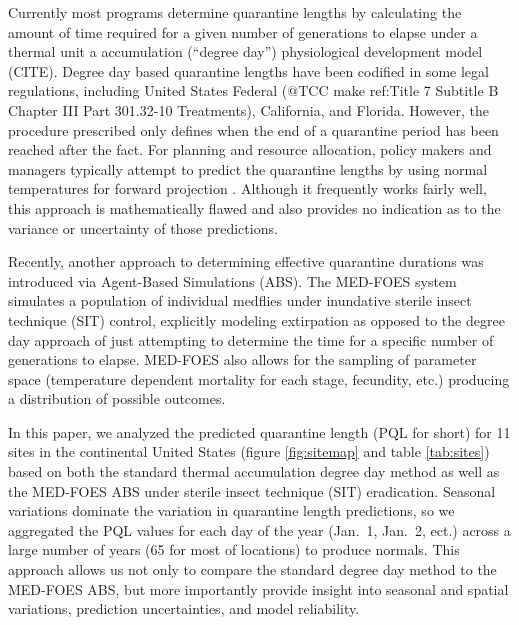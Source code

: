 \documentclass[10pt,a4paper,twocolumn]{article}
\begin{document}
Currently most programs determine quarantine lengths 
by calculating the amount of time required for a given number 
of generations to elapse under a thermal unit a accumulation (``degree day'')
physiological development model (CITE).
Degree day based quarantine lengths have been codified in some legal
regulations, including United States Federal 
(@TCC make ref:Title 7 Subtitle B Chapter III Part 301.32-10 Treatments),
California\cite{3-CA-ADC-3406}, and Florida\cite{personal communication}.
However, the procedure prescribed only defines when the end of a
quarantine period has been reached after the fact.
For planning and resource allocation, policy makers and managers 
typically attempt to predict the quarantine lengths by using
normal temperatures for forward projection \cite{??}.
Although it frequently works fairly well,
this approach is mathematically flawed 
and also provides no indication as to the variance or uncertainty
of those predictions.

Recently, another approach to determining effective quarantine 
durations was introduced via Agent-Based Simulations (ABS)\cite{manoukis_agent-based_2014}. 
The MED-FOES system simulates a population of individual medflies 
under inundative sterile insect technique (SIT) control, 
explicitly modeling extirpation as opposed to the degree day 
approach of just attempting to determine the time for a specific
number of generations to elapse.
MED-FOES also allows for the sampling of parameter space
(temperature dependent mortality for each stage, fecundity, etc.)
producing a distribution of possible outcomes.

In this paper, we analyzed the predicted quarantine length (PQL for short) 
for 11 sites in the continental United States
(figure \ref{fig:sitemap} and table \ref{tab:sites})
based on both the standard thermal accumulation degree day method\cite{ECY:ECY1969503514} 
as well as the MED-FOES\cite{manoukis_computer_2014} ABS under sterile insect technique (SIT)\cite{??} eradication.
Seasonal variations dominate the variation in quarantine length predictions, 
so we aggregated the PQL values for each day of the year 
(Jan.\ 1, Jan.\ 2, ect.) 
across a large number of years (65 for most of locations) to produce normals.
This approach allows us not only to compare the standard degree day 
method to the MED-FOES ABS, but more importantly provide insight 
into seasonal and spatial variations, prediction uncertainties, 
and model reliability.
\end{document}
